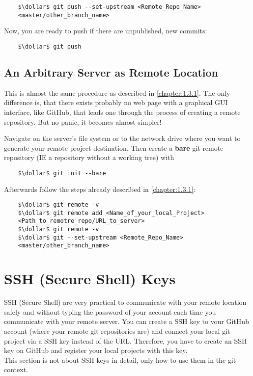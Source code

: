 \begin{lstlisting}
	$\dollar$ git push --set-upstream <Remote_Repo_Name> 
	<master/other_branch_name>
\end{lstlisting}

Now, you are ready to push if there are unpublished, new commits:
\begin{lstlisting}
	$\dollar$ git push
\end{lstlisting}




\subsection{An Arbitrary Server as Remote Location}
\label{chapter:1.3.3}

This is almost the same procedure as described in \cref{chapter:1.3.1}. The only difference is, that there exists probably no web page with 
a graphical GUI interface, like GitHub, that leads one through the process of creating a remote repository. But no panic, it becomes almost simpler!


Navigate on the server's file system or to the network drive where you want to generate your remote project destination. Then create a \textbf{bare} git remote 
repository (\ac{IE} a repository without a working tree) with
\begin{lstlisting}
	$\dollar$ git init --bare
\end{lstlisting}

Afterwards follow the steps already described in \cref{chapter:1.3.1}:
\begin{lstlisting}
	$\dollar$ git remote -v
	$\dollar$ git remote add <Name_of_your_local_Project> 
	<Path_to_remotre_repo/URL_to_server>
	$\dollar$ git remote -v
	$\dollar$ git --set-upstream <Remote_Repo_Name> 
	<master/other_branch_name>
\end{lstlisting}


\section{SSH (Secure Shell) Keys}
\label{chapter:1.4}

SSH (Secure Shell) are very practical to communicate with your remote location safely and without typing the password of your account each time you 
communicate with your remote server. You can create a SSH key to your GitHub account (where your remote git repositories are) and connect your local git project via 
a SSH key instead of the URL. Therefore, you have to create an SSH key on GitHub and register your local projects with this key.
\\
This section is not about SSH keys in detail, only how to use them in the git context. 

